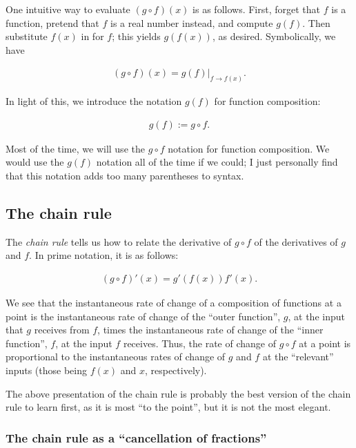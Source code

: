 One intuitive way to evaluate $(g \circ f)(x)$ is as follows. First, forget that $f$ is a function, pretend that $f$ is a real number instead, and compute $g(f)$. Then substitute $f(x)$ in for $f$; this yields $g(f(x))$, as desired. Symbolically, we have

\begin{align*}
    (g \circ f)(x) = g(f)|_{f \rightarrow f(x)}.
\end{align*}

In light of this, we introduce the notation $g(f)$ for function composition:

\begin{align*}
    g(f) := g \circ f.
\end{align*}

Most of the time, we will use the $g \circ f$ notation for function composition. We would use the $g(f)$ notation all of the time if we could; I just personally find that this notation adds too many parentheses to syntax.

\subsection*{The chain rule}

The \textit{chain rule} tells us how to relate the derivative of $g \circ f$ of the derivatives of $g$ and $f$. In prime notation, it is as follows:

\begin{align*}
    (g \circ f)'(x) = g'(f(x)) f'(x).
\end{align*}

We see that the instantaneous rate of change of a composition of functions at a point is the instantaneous rate of change of the ``outer function'', $g$, at the input that $g$ receives from $f$, times the instantaneous rate of change of the ``inner function'', $f$, at the input $f$ receives. Thus, the rate of change of $g \circ f$ at a point is proportional to the instantaneous rates of change of $g$ and $f$ at the ``relevant'' inputs (those being $f(x)$ and $x$, respectively).

The above presentation of the chain rule is probably the best version of the chain rule to learn first, as it is most ``to the point'', but it is not the most elegant.

\subsubsection*{The chain rule as a ``cancellation of fractions''}

